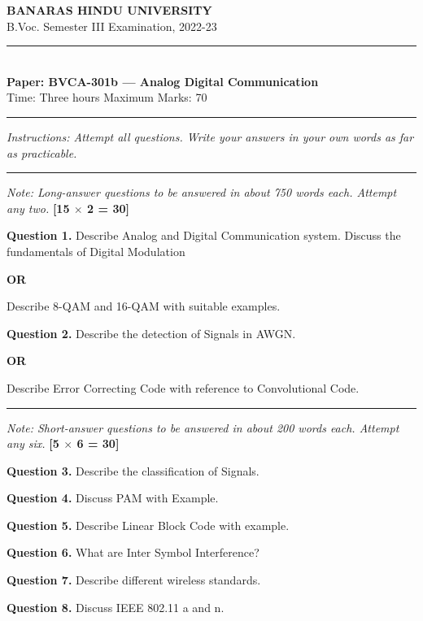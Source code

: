\documentclass[11pt,a4paper]{article}
\begin{document}
\begin{center}
  {\large\bfseries BANARAS HINDU UNIVERSITY}\\[2pt]
  {\normalsize B.Voc. Semester III Examination, 2022-23}\\[6pt]
  \rule{0.8\linewidth}{0.5pt}\\[6pt]
  {\large\bfseries Paper: BVCA-301b --- Analog Digital Communication}\\[4pt]
  {\normalsize Time: Three hours \hfill Maximum Marks: 70}
\end{center}

\rule{\linewidth}{0.4pt}

\smallskip
\noindent\textit{Instructions: Attempt all questions. Write your answers in your own words as far as practicable.}

\bigskip

\bigskip{}
\rule{\linewidth}{0.4pt}\smallskip

\noindent\textit{Note: Long-answer questions to be answered in about 750 words each. Attempt any two.} \hfill \textbf{[15 $\times$ 2 = 30]}

\medskip\noindent\textbf{Question 1.} Describe Analog and Digital Communication system. Discuss the fundamentals of
Digital Modulation
\centerline{\textbf{OR}}
Describe 8-QAM and 16-QAM with suitable examples.

\medskip\noindent\textbf{Question 2.} Describe the detection of Signals in AWGN.
\centerline{\textbf{OR}}
Describe Error Correcting Code with reference to Convolutional Code.

\bigskip{}
\rule{\linewidth}{0.4pt}\smallskip

\noindent\textit{Note: Short-answer questions to be answered in about 200 words each. Attempt any six.} \hfill \textbf{[5 $\times$ 6 = 30]}

\medskip\noindent\textbf{Question 3.} Describe the classification of Signals.

\medskip\noindent\textbf{Question 4.} Discuss PAM with Example.

\medskip\noindent\textbf{Question 5.} Describe Linear Block Code with example.

\medskip\noindent\textbf{Question 6.} What are Inter Symbol Interference?

\medskip\noindent\textbf{Question 7.} Describe different wireless standards.

\medskip\noindent\textbf{Question 8.} Discuss IEEE 802.11 a and n.
\end{document}
